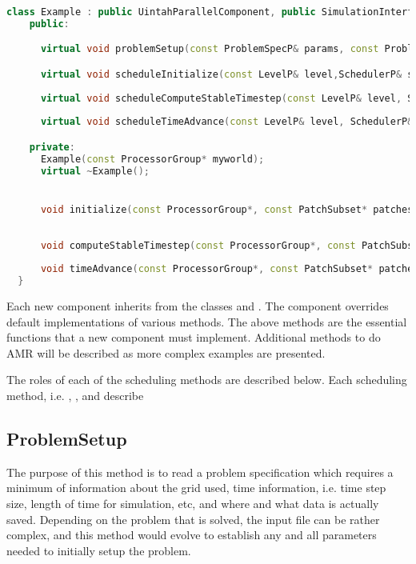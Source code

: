 \begin{lstlisting}[language=Cpp]
  class Example : public UintahParallelComponent, public SimulationInterface {
    public:

      virtual void problemSetup(const ProblemSpecP& params, const ProblemSpecP& restart_prob_spec, GridP& grid, SimulationStateP&);

      virtual void scheduleInitialize(const LevelP& level,SchedulerP& sched);
    
      virtual void scheduleComputeStableTimestep(const LevelP& level, SchedulerP&);
    
      virtual void scheduleTimeAdvance(const LevelP& level, SchedulerP&);

    private:
      Example(const ProcessorGroup* myworld);
      virtual ~Example();


      void initialize(const ProcessorGroup*, const PatchSubset* patches, const MaterialSubset* matls, DataWarehouse* old_dw, DataWarehouse* new_dw);
    
    
      void computeStableTimestep(const ProcessorGroup*, const PatchSubset* patches, const MaterialSubset* matls, DataWarehouse* old_dw, DataWarehouse* new_dw);
    
      void timeAdvance(const ProcessorGroup*, const PatchSubset* patches, const MaterialSubset* matls, DataWarehouse* old_dw, DataWarehouse* new_dw);
  }
\end{lstlisting}

Each new component inherits from the classes
 and .
The component overrides default implementations of various methods.
The above methods are the essential functions that a new component
must implement.  Additional methods to do AMR will be described as
more complex examples are presented.

The roles of each of the scheduling methods are described below.  Each
scheduling method, i.e. ,
, and
 describe

\subsection{ProblemSetup}

The purpose of this method is to read a problem specification which
requires a minimum of information about the grid used, time
information, i.e. time step size, length of time for simulation, etc,
and where and what data is actually saved.  Depending on the problem
that is solved, the input file can be rather complex, and this method
would evolve to establish any and all parameters needed to initially
setup the problem.

